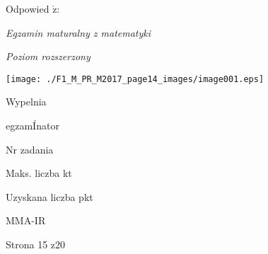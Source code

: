 \documentclass[a4paper,12pt]{article}
\begin{document}
Odpowied $\acute{\mathrm{z}}$:

{\it Egzamin maturalny z matematyki}

{\it Poziom rozszerzony}
\begin{center}
\texttt{[image: ./F1\_M\_PR\_M2017\_page14\_images/image001.eps]}
\end{center}
Wypelnia

egzamÍnator

Nr zadania

Maks. liczba kt

Uzyskana liczba pkt

MMA-IR

Strona 15 z20
\end{document}
